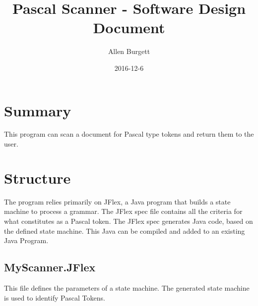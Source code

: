 \documentclass{article}
\title{Pascal Scanner - Software Design Document}
\date{2016-12-6}
\author{Allen Burgett}
\begin{document}
\maketitle
\pagebreak


\section{Summary}
This program can scan a document for Pascal type tokens and return them to the user.

\section{Structure}
The program relies primarily on JFlex, a Java program that builds a state machine to process a grammar. The JFlex spec file contains all the criteria for what constitutes as a Pascal token. The JFlex spec generates Java code, based on the defined state machine. This Java can be compiled and added to an existing Java Program.

\subsection{MyScanner.JFlex}
This file defines the parameters of a state machine. The generated state machine is used to identify Pascal Tokens.


\end{document}
